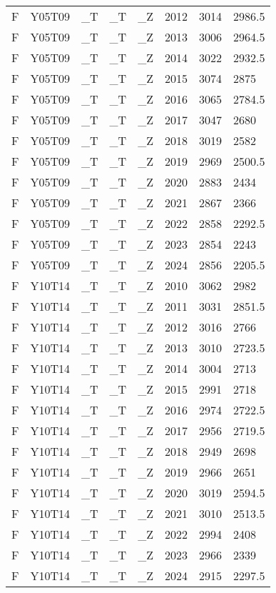 \begin{longtable}[t]{llllllll}
F & Y05T09 & \_T & \_T & \_Z & 2012 & 3014 & 2986.5\\
F & Y05T09 & \_T & \_T & \_Z & 2013 & 3006 & 2964.5\\
F & Y05T09 & \_T & \_T & \_Z & 2014 & 3022 & 2932.5\\
\addlinespace
F & Y05T09 & \_T & \_T & \_Z & 2015 & 3074 & 2875\\
F & Y05T09 & \_T & \_T & \_Z & 2016 & 3065 & 2784.5\\
F & Y05T09 & \_T & \_T & \_Z & 2017 & 3047 & 2680\\
F & Y05T09 & \_T & \_T & \_Z & 2018 & 3019 & 2582\\
F & Y05T09 & \_T & \_T & \_Z & 2019 & 2969 & 2500.5\\
\addlinespace
F & Y05T09 & \_T & \_T & \_Z & 2020 & 2883 & 2434\\
F & Y05T09 & \_T & \_T & \_Z & 2021 & 2867 & 2366\\
F & Y05T09 & \_T & \_T & \_Z & 2022 & 2858 & 2292.5\\
F & Y05T09 & \_T & \_T & \_Z & 2023 & 2854 & 2243\\
F & Y05T09 & \_T & \_T & \_Z & 2024 & 2856 & 2205.5\\
\addlinespace
F & Y10T14 & \_T & \_T & \_Z & 2010 & 3062 & 2982\\
F & Y10T14 & \_T & \_T & \_Z & 2011 & 3031 & 2851.5\\
F & Y10T14 & \_T & \_T & \_Z & 2012 & 3016 & 2766\\
F & Y10T14 & \_T & \_T & \_Z & 2013 & 3010 & 2723.5\\
F & Y10T14 & \_T & \_T & \_Z & 2014 & 3004 & 2713\\
\addlinespace
F & Y10T14 & \_T & \_T & \_Z & 2015 & 2991 & 2718\\
F & Y10T14 & \_T & \_T & \_Z & 2016 & 2974 & 2722.5\\
F & Y10T14 & \_T & \_T & \_Z & 2017 & 2956 & 2719.5\\
F & Y10T14 & \_T & \_T & \_Z & 2018 & 2949 & 2698\\
F & Y10T14 & \_T & \_T & \_Z & 2019 & 2966 & 2651\\
\addlinespace
F & Y10T14 & \_T & \_T & \_Z & 2020 & 3019 & 2594.5\\
F & Y10T14 & \_T & \_T & \_Z & 2021 & 3010 & 2513.5\\
F & Y10T14 & \_T & \_T & \_Z & 2022 & 2994 & 2408\\
F & Y10T14 & \_T & \_T & \_Z & 2023 & 2966 & 2339\\
F & Y10T14 & \_T & \_T & \_Z & 2024 & 2915 & 2297.5\\

\end{longtable}
